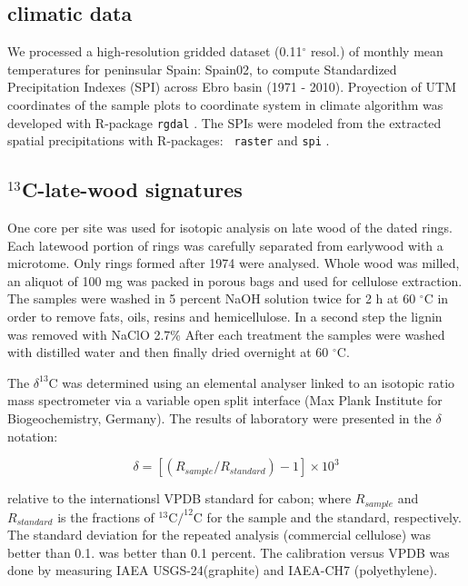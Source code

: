 \documentclass[review,authoryear]{elsarticle}
\begin{document}
\subsection{climatic data}
We processed a high-resolution gridded dataset (0.11$^{\circ}$ resol.)
of monthly mean temperatures for peninsular Spain: Spain02,
\citep{Herrera2015} to compute Standardized Precipitation Indexes
(SPI) across Ebro basin (1971 - 2010). Proyection of UTM coordinates
of the sample plots to coordinate system in climate algorithm was
developed with R-package {\tt rgdal} \citep{Bivand2015}. The SPIs were
modeled from the extracted spatial precipitations with R-packages: {\tt
  raster}\citep{Hijmans2015} and {\tt spi} \citep{Neves2012}.

\subsection{$^{13}$C-late-wood signatures}
One core per site was used for isotopic analysis on late wood of the
dated rings. Each latewood portion of rings was carefully separated
from earlywood with a microtome. Only rings formed after 1974 were
analysed. Whole wood was milled, an aliquot of 100 mg was packed in
porous bags and used for cellulose extraction. The samples were washed
in 5 percent NaOH solution twice for 2 h at 60 $^{\circ}$C in order to
remove fats, oils, resins and hemicellulose. In a second step the
lignin was removed with NaClO 2.7\% After each treatment the samples
were washed with distilled water and then finally dried overnight at
60 $^{\circ}$C.

The $\delta^{13}$C was determined using an elemental analyser linked
to an isotopic ratio mass spectrometer via a variable open split
interface (Max Plank Institute for Biogeochemistry, Germany). The
results of laboratory were presented in the $\delta$ notation:

\begin{equation}\label{eq:dC}
\delta = \left [ \left ( R_{sample}/R_{standard} \right )-1 \right ]\times 10^3 
\end{equation}

relative to the internationsl VPDB standard for cabon; where
$R_{sample}$ and $R_{standard}$ is the fractions of $^{13}$C$/^{12}$C
for the sample and the standard, respectively. The standard deviation
for the repeated analysis (commercial cellulose) was better than
0.1. was better than 0.1 percent. The calibration versus VPDB was done
by measuring IAEA USGS-24(graphite) and IAEA-CH7 (polyethylene).
\end{document}

